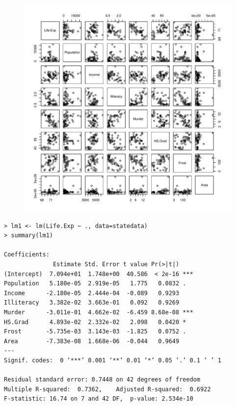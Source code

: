 \documentclass[10pt]{beamer}\usepackage[]{graphicx}\usepackage[]{color}
\begin{document}
\begin{frame}
\begin{figure}
\includegraphics[scale=0.5]{figure/state_pairs.pdf}
\end{figure}
\end{frame}

\begin{frame}[fragile]
\scriptsize
\begin{verbatim}
> lm1 <- lm(Life.Exp ~ ., data=statedata)
> summary(lm1)

Coefficients:
              Estimate Std. Error t value Pr(>|t|)    
(Intercept)  7.094e+01  1.748e+00  40.586  < 2e-16 ***
Population   5.180e-05  2.919e-05   1.775   0.0832 .  
Income      -2.180e-05  2.444e-04  -0.089   0.9293    
Illiteracy   3.382e-02  3.663e-01   0.092   0.9269    
Murder      -3.011e-01  4.662e-02  -6.459 8.68e-08 ***
HS.Grad      4.893e-02  2.332e-02   2.098   0.0420 *  
Frost       -5.735e-03  3.143e-03  -1.825   0.0752 .  
Area        -7.383e-08  1.668e-06  -0.044   0.9649    
---
Signif. codes:  0 ‘***’ 0.001 ‘**’ 0.01 ‘*’ 0.05 ‘.’ 0.1 ‘ ’ 1

Residual standard error: 0.7448 on 42 degrees of freedom
Multiple R-squared:  0.7362,	Adjusted R-squared:  0.6922 
F-statistic: 16.74 on 7 and 42 DF,  p-value: 2.534e-10
\end{verbatim}
\end{frame}
\end{document}
